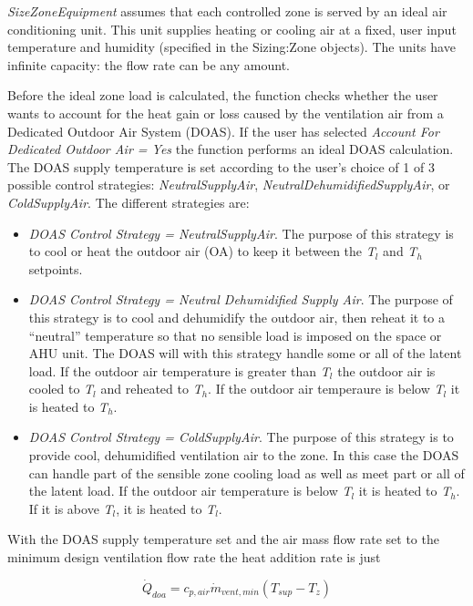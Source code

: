 \emph{SizeZoneEquipment} assumes that each controlled zone is served by an ideal air conditioning unit. This unit supplies heating or cooling air at a fixed, user input temperature and humidity (specified in the Sizing:Zone objects). The units have infinite capacity: the flow rate can be any amount.

Before the ideal zone load is calculated, the function checks whether the user wants to account for the heat gain or loss caused by the ventilation air from a Dedicated Outdoor Air System (DOAS). If the user has selected \emph{Account For Dedicated Outdoor Air = Yes} the function performs an ideal DOAS calculation. The DOAS supply temperature is set according to the user's choice of 1 of 3 possible control strategies: \emph{NeutralSupplyAir}, \emph{NeutralDehumidifiedSupplyAir}, or \emph{ColdSupplyAir}. The different strategies are:

\begin{itemize}
\item
  \emph{DOAS Control Strategy = NeutralSupplyAir}. The purpose of this strategy is to cool or heat the outdoor air (OA) to keep it between the \emph{T\(_{l}\)} and \emph{T\(_{h}\)} setpoints.
\item
  \emph{DOAS Control Strategy = Neutral Dehumidified Supply Air}. The purpose of this strategy is to cool and dehumidify the outdoor air, then reheat it to a ``neutral'' temperature so that no sensible load is imposed on the space or AHU unit. The DOAS will with this strategy handle some or all of the latent load. If the outdoor air temperature is greater than \emph{T\(_{l}\)} the outdoor air is cooled to \emph{T\(_{l}\)} and reheated to \emph{T\(_{h}\)}. If the outdoor air temperaure is below \emph{T\(_{l}\)} it is heated to \emph{T\(_{h}\)}.
\item
  \emph{DOAS Control Strategy = ColdSupplyAir}. The purpose of this strategy is to provide cool, dehumidified ventilation air to the zone. In this case the DOAS can handle part of the sensible zone cooling load as well as meet part or all of the latent load. If the outdoor air temperature is below \emph{T\(_{l}\)} it is heated to \emph{T\(_{h}\)}. If it is above \emph{T\(_{l}\)}, it is heated to \emph{T\(_{l}\)}.
\end{itemize}

With the DOAS supply temperature set and the air mass flow rate set to the minimum design ventilation flow rate the heat addition rate is just

\begin{equation}
{\dot Q_{doa}} = {c_{p,air}}{\dot m_{vent,min}}({T_{sup}} - {T_z})
\end{equation}

